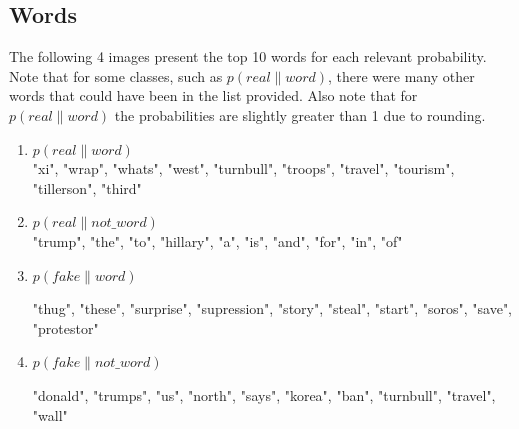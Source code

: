 \documentclass{article}
\begin{document}
   \subsection{Words}
   The following 4 images present the top 10 words for each relevant probability. Note that for some classes,
   such as $p(real \| word)$, there were many other words that could have been in the list provided. Also note
   that for $ p(real \| word)$ the probabilities are slightly greater than 1 due to rounding.
   \begin{enumerate}
   \item $p(real \| word)$
   \\

	
	"xi", "wrap", "whats", "west", "turnbull", "troops", "travel", "tourism", "tillerson", "third"

   \item $p(real \| not\_word)$
   \\

	"trump", "the", "to", "hillary", "a", "is", "and", "for", "in", "of"


   \item $p(fake \| word)$
   
	"thug", "these", "surprise", "supression", "story", "steal", "start", "soros", "save", "protestor"


   \item $p(fake \| not\_word)$
   

	"donald", "trumps", "us", "north", "says", "korea", "ban", "turnbull", "travel", "wall"



   \end{enumerate}
\end{document}
